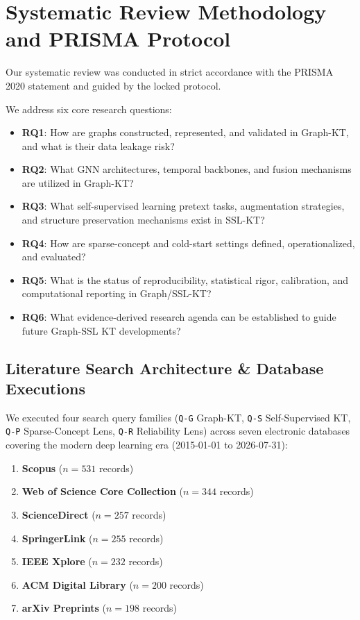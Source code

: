 \documentclass[10pt,journal,compsoc]{IEEEtran}
\begin{document}
\section{Systematic Review Methodology and PRISMA Protocol}
Our systematic review was conducted in strict accordance with the PRISMA 2020 statement and guided by the locked protocol.

We address six core research questions:
\begin{itemize}
    \item \textbf{RQ1}: How are graphs constructed, represented, and validated in Graph-KT, and what is their data leakage risk?
    \item \textbf{RQ2}: What GNN architectures, temporal backbones, and fusion mechanisms are utilized in Graph-KT?
    \item \textbf{RQ3}: What self-supervised learning pretext tasks, augmentation strategies, and structure preservation mechanisms exist in SSL-KT?
    \item \textbf{RQ4}: How are sparse-concept and cold-start settings defined, operationalized, and evaluated?
    \item \textbf{RQ5}: What is the status of reproducibility, statistical rigor, calibration, and computational reporting in Graph/SSL-KT?
    \item \textbf{RQ6}: What evidence-derived research agenda can be established to guide future Graph-SSL KT developments?
\end{itemize}

\subsection{Literature Search Architecture \& Database Executions}
We executed four search query families (\texttt{Q-G} Graph-KT, \texttt{Q-S} Self-Supervised KT, \texttt{Q-P} Sparse-Concept Lens, \texttt{Q-R} Reliability Lens) across seven electronic databases covering the modern deep learning era (2015-01-01 to 2026-07-31):
\begin{enumerate}
    \item \textbf{Scopus} ($n = 531$ records)
    \item \textbf{Web of Science Core Collection} ($n = 344$ records)
    \item \textbf{ScienceDirect} ($n = 257$ records)
    \item \textbf{SpringerLink} ($n = 255$ records)
    \item \textbf{IEEE Xplore} ($n = 232$ records)
    \item \textbf{ACM Digital Library} ($n = 200$ records)
    \item \textbf{arXiv Preprints} ($n = 198$ records)
\end{enumerate}
\end{document}
